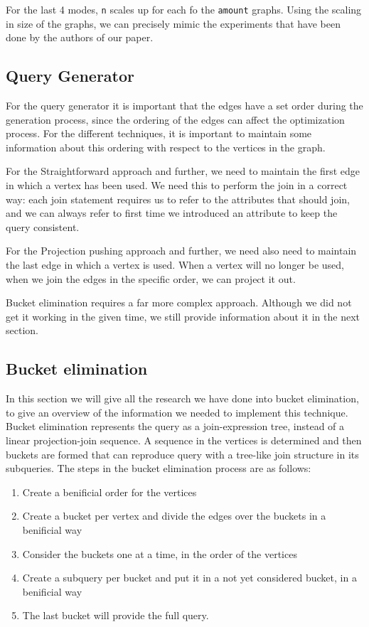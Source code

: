 For the last 4 modes, \texttt{n} scales up for each fo the \texttt{amount} graphs. Using the scaling in size of the graphs, we can precisely mimic the experiments that have been done by the authors of our paper.

\subsection{Query Generator}
For the query generator it is important that the edges have a set order during the generation process, since the ordering of the edges can affect the optimization process. For the different techniques, it is important to maintain some information about this ordering with respect to the vertices in the graph.

For the Straightforward approach and further, we need to maintain the first edge in which a vertex has been used. We need this to perform the join in a correct way: each join statement requires us to refer to the attributes that should join, and we can always refer to first time we introduced an attribute to keep the query consistent.

For the Projection pushing approach and further, we need also need to maintain the last edge in which a vertex is used. When a vertex will no longer be used, when we join the edges in the specific order, we can project it out.

Bucket elimination requires a far more complex approach. Although we did not get it working in the given time, we still provide information about it in the next section.

\subsection{Bucket elimination}
In this section we will give all the research we have done into bucket elimination, to give an overview of the information we needed to implement this technique.\\

Bucket elimination represents the query as a join-expression tree, instead of a linear projection-join sequence. A sequence in the vertices is determined and then buckets are formed that can reproduce query with a tree-like join structure in its subqueries. The steps in the bucket elimination process are as follows:

\begin{enumerate}
	\item Create a benificial order for the vertices
	\item Create a bucket per vertex and divide the edges over the buckets in a benificial way
	\item Consider the buckets one at a time, in the order of the vertices
	\item Create a subquery per bucket and put it in a not yet considered bucket, in a benificial way
	\item The last bucket will provide the full query.
\end{enumerate}


